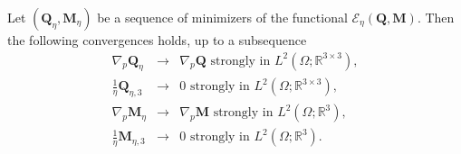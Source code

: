 \documentclass[10pt,a4paper]{amsart}
\def \Mvec{\mathbf{M}}
\def\Qvec{\mathbf{Q}}
\begin{document}
\begin{proposition}\label{reduced-QM}
Let $\left(\Qvec_{\eta}, \Mvec_{\eta}\right)$ be a sequence of minimizers of the functional $\mathcal{E}_{\eta}\left(\Qvec, \Mvec\right)$. Then the following convergences holds, up to a subsequence
\begin{eqnarray}
\nabla_p\Qvec_{\eta}&\rightarrow&\nabla_p\Qvec \mbox{ strongly in } L^2\left(\Omega; \mathbb R^{3\times 3}\right),\label{eq:strong_gQ}\\
\frac{1}{\eta}\Qvec_{\eta,3}&\rightarrow& 0 \mbox{ strongly in } L^2\left(\Omega; \mathbb R^{3\times 3}\right),\label{eq:strong1_gQ}\\
\nabla_p\Mvec_{\eta}&\rightarrow&\nabla_p\Mvec \mbox{ strongly in } L^2\left(\Omega; \mathbb R^{3}\right),\label{eq:strong_gM}\\
\frac{1}{\eta}\Mvec_{\eta,3}&\rightarrow& 0 \mbox{ strongly in } L^2\left(\Omega; \mathbb R^{3}\right)\label{eq:strong1_gM}.
\end{eqnarray}
\end{proposition}
\end{document}
